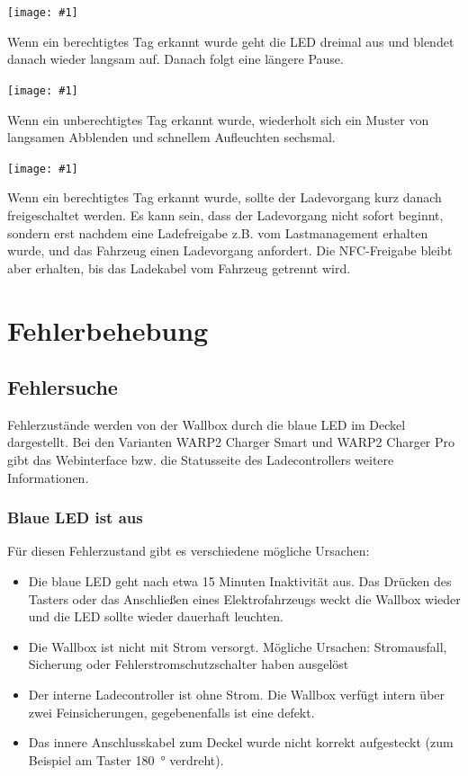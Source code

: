 \documentclass[a4paper,10pt]{article}
\newcommand{\gfx}[1]{\texttt{[image: \#1]}}
\begin{document}
\begin{multicols*}{2}
	\gfx{./img_warp2/resized/blink_nag}

	Wenn ein berechtigtes Tag erkannt wurde geht die LED
	dreimal aus und blendet danach wieder langsam auf. Danach folgt eine längere Pause.

	\gfx{./img_warp2/resized/blink_ack}

	Wenn ein unberechtigtes Tag erkannt wurde, wiederholt sich ein Muster von langsamen Abblenden
	und schnellem Aufleuchten sechsmal.

	\gfx{./img_warp2/resized/blink_nack}

	Wenn ein berechtigtes Tag erkannt wurde, sollte der Ladevorgang kurz danach
	freigeschaltet werden. Es kann sein, dass der Ladevorgang nicht
	sofort beginnt, sondern erst nachdem eine Ladefreigabe z.B. vom Lastmanagement erhalten wurde,
	und das Fahrzeug einen Ladevorgang anfordert. Die NFC-Freigabe bleibt aber erhalten,
	bis das Ladekabel vom Fahrzeug getrennt wird.

	\newpage \section{Fehlerbehebung}\label{fehlerbehebung} \subsection{Fehlersuche}
	Fehlerzustände werden von der Wallbox durch die blaue LED im Deckel
	dargestellt. Bei den Varianten WARP2 Charger Smart und WARP2 Charger Pro
	gibt das Webinterface bzw. die Statusseite des Ladecontrollers
	weitere Informationen.

	\subsubsection*{Blaue LED ist aus}
	Für diesen Fehlerzustand gibt es verschiedene mögliche Ursachen:
	\begin{itemize}
		\item Die blaue LED geht nach etwa 15 Minuten Inaktivität aus. Das Drücken des Tasters
		      oder das Anschließen eines Elektrofahrzeugs weckt die Wallbox wieder
		      und die LED sollte wieder dauerhaft leuchten.
		\item Die Wallbox ist nicht mit Strom versorgt. Mögliche Ursachen: Stromausfall,
		      Sicherung oder Fehlerstrom\-schutzschalter haben ausgelöst
		\item Der interne Ladecontroller ist ohne Strom. Die Wallbox verfügt intern über zwei
		      Feinsicherungen, gegebenenfalls ist eine defekt.
		\item Das innere Anschlusskabel zum Deckel wurde nicht korrekt aufgesteckt (zum Beispiel am Taster \SI{180}{\degree} verdreht).
	\end{itemize}


\end{multicols*}
\end{document}
